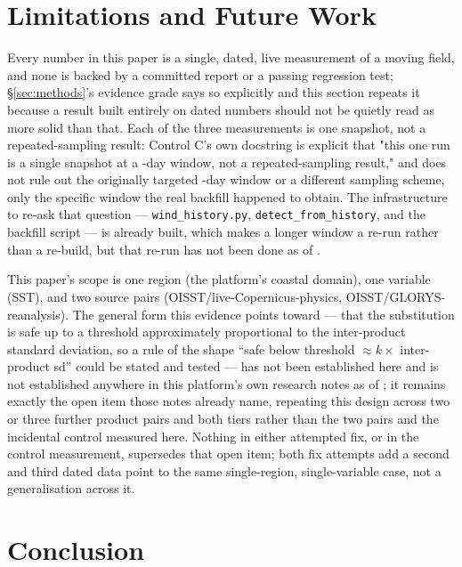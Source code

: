 \section{Limitations and Future Work}
\label{sec:limitations}

Every number in this paper is a single, dated, live measurement of a moving
field, and none is backed by a committed report or a passing regression
test; \S\ref{sec:methods}'s evidence grade says so explicitly and this
section repeats it because a result built entirely on dated numbers should
not be quietly read as more solid than that. Each of the three measurements
is one snapshot, not a repeated-sampling result: Control C's own docstring is
explicit that "this one run is a single snapshot at a
\WindHistoryWindowDays{}-day window, not a repeated-sampling result," and
does not rule out the originally targeted \WindHistoryTargetWindowDays{}-day
window or a different sampling scheme, only the specific window the real
backfill happened to obtain. The infrastructure to re-ask that question ---
\texttt{wind\_history.py}, \texttt{detect\_from\_history}, and the backfill
script --- is already built, which makes a longer window a re-run rather than
a re-build, but that re-run has not been done as of \AsOf{}.

This paper's scope is one region (the platform's coastal domain), one
variable (SST), and two source pairs (OISST/live-Copernicus-physics,
OISST/GLORYS-reanalysis). The general form this evidence points toward ---
that the substitution is safe up to a threshold approximately proportional to
the inter-product standard deviation, so a rule of the shape ``safe below
threshold \(\approx k \times\) inter-product sd'' could be stated and tested
--- has not been established here and is not established anywhere in this
platform's own research notes as of \AsOf{}; it remains exactly the open item
those notes already name, repeating this design across two or three further
product pairs and both tiers rather than the two pairs and the incidental
control measured here. Nothing in either attempted fix, or in the control
measurement, supersedes that open item; both fix attempts add a second and
third dated data point to the same single-region, single-variable case, not
a generalisation across it.

\section{Conclusion}

